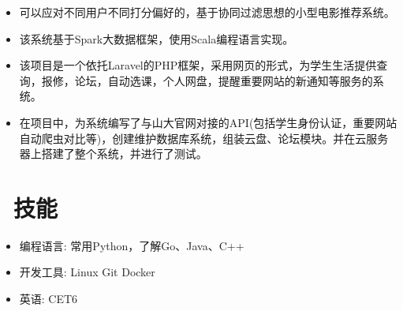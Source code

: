 \documentclass{resume}
\begin{document}
  \begin{itemize}[topsep = 0 pt, partopsep = 0pt]
    \item 可以应对不同用户不同打分偏好的，基于协同过滤思想的小型电影推荐系统。
    \item 该系统基于Spark大数据框架，使用Scala编程语言实现。
  \end{itemize}

  \begin{itemize}[topsep = 0 pt, partopsep = 0pt]
    \item 该项目是一个依托Laravel的PHP框架，采用网页的形式，为学生生活提供查询，报修，论坛，自动选课，个人网盘，提醒重要网站的新通知等服务的系统。
    \item 在项目中，为系统编写了与山大官网对接的API(包括学生身份认证，重要网站自动爬虫对比等)，创建维护数据库系统，组装云盘、论坛模块。并在云服务器上搭建了整个系统，并进行了测试。
  \end{itemize}
  
  
  \section{\faCogs\ 技能}
  \begin{itemize}[parsep=0.5ex]
    \item 编程语言: 常用Python，了解Go、Java、C++
    \item 开发工具: Linux Git Docker
    \item 英语: CET6
  \end{itemize}
  
  
\end{document}
